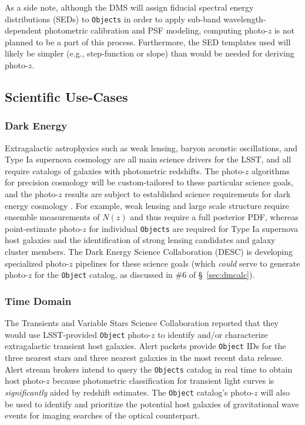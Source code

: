 \documentclass[DM,lsstdraft,toc]{lsstdoc}
\begin{document}
As a side note, although the DMS will assign fiducial spectral energy distributions (SEDs) to {\tt Objects} in order to apply sub-band wavelength-dependent photometric calibration and PSF modeling, computing photo-$z$ is not planned to be a part of this process.
Furthermore, the SED templates used will likely be simpler (e.g., step-function or slope) than would be needed for deriving photo-$z$.

\subsection{Scientific Use-Cases}\label{ssec:use_sci}

\subsubsection{Dark Energy}
Extragalactic astrophysics such as weak lensing, baryon acoustic oscillations, and Type Ia supernova cosmology are all main science drivers for the LSST, and all require catalogs of galaxies with photometric redshifts.
The photo-$z$ algorithms for precision cosmology will be custom-tailored to these particular science goals, and the photo-$z$ results are subject to established science requirements for dark energy cosmology \citep{2018arXiv180901669T}.
For example, weak lensing and large scale structure require ensemble measurements of $N(z)$ and thus require a full posterior PDF, whereas point-estimate photo-$z$ for individual {\tt Objects} are required for Type Ia supernova host galaxies and the identification of strong lensing candidates and galaxy cluster members. 
The Dark Energy Science Collaboration (DESC) is developing specialized photo-$z$ pipelines for these science goals (which {\it could} serve to generate photo-$z$ for the {\tt Object} catalog, as discussed in \#6 of \S~\ref{sec:dmcalc}).

\subsubsection{Time Domain}
The Transients and Variable Stars Science Collaboration reported that they would use LSST-provided {\tt Object} photo-$z$ to identify and/or characterize extragalactic transient host galaxies.
Alert packets provide {\tt Object} IDs for the three nearest stars and three nearest galaxies in the most recent data release.
Alert stream brokers intend to query the {\tt Objects} catalog in real time to obtain host photo-$z$ because photometric classification for transient light curves is {\it significantly} aided by redshift estimates.
The {\tt Object} catalog's photo-$z$ will also be used to identify and prioritize the potential host galaxies of gravitational wave events for imaging searches of the optical counterpart.
\end{document}
